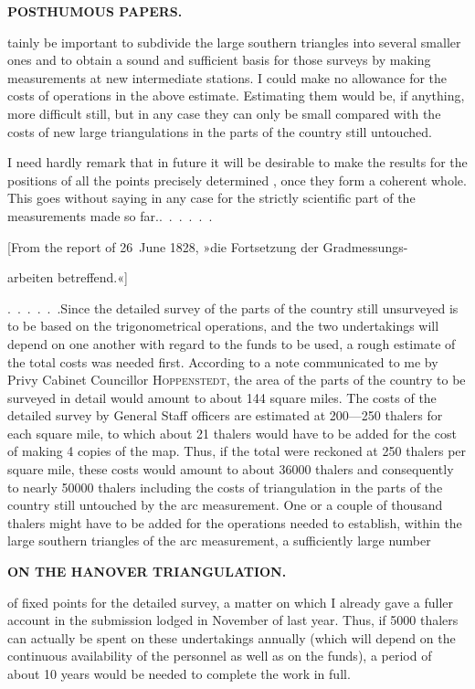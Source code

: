 \par\clearpage
\noindent{}\hfill{\small\textbf{POSTHUMOUS PAPERS.}}\hfill\null\par\medskip
\noindent tainly be important to subdivide the large southern triangles into
several smaller ones and to obtain a sound and sufficient basis for those
surveys by making measurements at new intermediate stations. I could make no
allowance for the costs of  operations in the above estimate. Estimating
them would be, if anything, more difficult still, but in any case they can only be
small compared with the costs of new large triangulations in the parts of the
country still untouched.

I need hardly remark that in future it will be desirable to make the results
for the positions of all the points precisely determined ,
once they form a coherent whole. This goes without saying in any case for the
strictly scientific part of the measurements made so far.\quad\mbox{.\ .\ .\ .\ .\ .}

\bigskip
\begin{center}
[From the report of 26~June 1828, »die Fortsetzung der Gradmessungs-\par
arbeiten betreffend.«]
\end{center}

\par\noindent\hspace*{\parindent}\mbox{.\ .\ .\ .\ .\ .}\quad Since the detailed survey of the parts of the country still
unsurveyed is to be based on the trigonometrical operations, and the two
undertakings will depend on one another with regard to the funds to be used,
a rough estimate of the total costs was needed first. According to a note
communicated to me by Privy Cabinet Councillor \textsc{Hoppenstedt}, the area
of the parts of the country to be surveyed in detail would amount to about
144 square miles. The costs of the detailed survey by General Staff officers
are estimated at 200---250 thalers for each square mile, to which about 21
thalers would have to be added for the cost of making 4 copies of the map.
Thus, if the total were reckoned at 250 thalers per square mile, these costs
would amount to about 36000 thalers and consequently to nearly 50000 thalers
including the costs of triangulation in the parts of the country still untouched
by the arc measurement. One or a couple of thousand thalers might have to be
added for the operations needed to establish, within the large southern
triangles of the arc measurement, a sufficiently large number
\par
\clearpage
\noindent\null\hfill{\small\textbf{ON THE HANOVER TRIANGULATION.}}\hfill{}\par\medskip
\noindent of fixed points for the detailed survey, a matter on which I already
gave a fuller account in the submission lodged in November of last year. Thus,
if 5000 thalers can actually be spent on these undertakings annually (which will
depend on the continuous availability of the personnel as well as on the funds),
a period of about 10 years would be needed to complete the work in full.

